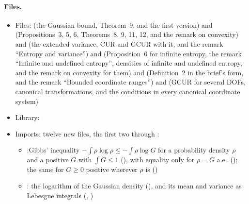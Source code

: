 \documentclass[11pt]{article}
\begin{document}
\paragraph{Files.}\leavevmode
\begin{itemize}
\item Files:  (the
  Gaussian bound, Theorem~9, and the first version) and
  (Propositions~3, 5, 6, Theorems~8, 9, 11, 12, and the remark on convexity) and
  (the extended variance, CUR and GCUR with it, and the remark ``Entropy and variance'') and
  (Proposition~6 for infinite entropy, the remark ``Infinite and undefined entropy'', densities
  of infinite and undefined entropy, and the remark on convexity for them) and
  (Definition~2 in the brief's form, and the remark ``Bounded coordinate ranges'') and
  (GCUR for several DOFs, canonical transformations, and the conditions in every canonical
  coordinate system)
\item Library: 
\item Imports: twelve new  files, the first two through
  :
  \begin{itemize}
  \item {}:\newline Gibbs' inequality
  $-\int\rho\log\rho \le -\int\rho\log G$ for a probability density $\rho$ and a positive $G$
  with $\int G \le 1$ (), with equality only for
  $\rho = G$ a.e.\ (); the same for $G \ge 0$
  positive wherever $\rho$ is ()
  \item {}: the logarithm of the
  Gaussian density (), and its mean and variance as Lebesgue integrals
  (, )

\end{itemize}
\end{itemize}
\end{document}
